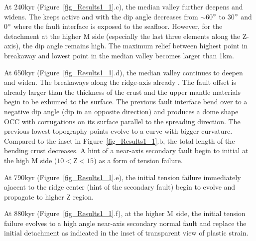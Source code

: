 At 240kyr (Figure~\ref{fig_Results1_1}.c), the median valley further deepens and widens. The  keeps active and  with the dip angle decreases from  $\sim$60$\degree$ to 30$\degree$ and 0$\degree$ where the fault interface is exposed to the seafloor. However, for the detachment at the higher M side (especially the last three elements along the Z-axis), the dip angle remains high. The maximum relief between highest point in breakaway and lowest point in the median valley becomes larger than 1km.

At 650kyr (Figure~\ref{fig_Results1_1}.d), the median valley continues to deepen and widen. The breakaways along the ridge-axis already . The fault offset is already larger than the thickness of the crust and the upper mantle materials begin to be exhumed to the surface. The previous fault interface bend over to a negative dip angle (dip in an opposite direction) and produces a dome shape OCC with corrugations on its surface parallel to the spreading direction. The previous lowest topography points evolve to a curve with bigger curvature. Compared to the inset in Figure~\ref{fig_Results1_1}.b, the total length of the bending crust decreases. A hint of a near-axis secondary fault begin to initial at the high M side ($10<$Z$<15$) as a form of tension failure. 

At 790kyr (Figure~\ref{fig_Results1_1}.e), the initial tension failure immediately ajacent to the ridge center (hint of the secondary fault) begin to evolve and propagate to higher Z region.  

At 880kyr (Figure~\ref{fig_Results1_1}.f), at the higher M side, the initial tension failure evolves to a high angle near-axis secondary normal fault and replace the initial detachment as indicated in the inset of transparent view of plastic strain.

